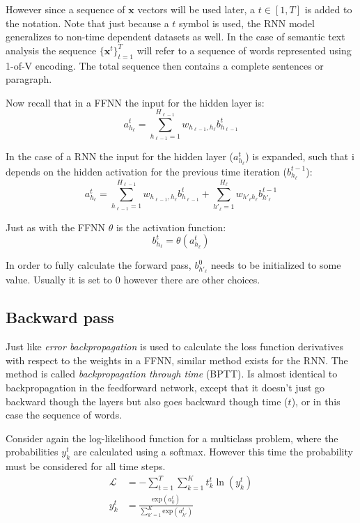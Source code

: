 However since a sequence of $\mathbf{x}$ vectors will be used later, a $t \in [1, T]$ is added to the notation. Note that just because a $t$ symbol is used, the RNN model generalizes to non-time dependent datasets as well. In the case of semantic text analysis the sequence $\{\mathbf{x}^t\}_{t=1}^T$ will refer to a sequence of words represented using 1-of-V encoding. The total sequence then contains a complete sentences or paragraph. 

Now recall that in a FFNN the input for the hidden layer is:
\begin{equation}
a_{h_\ell}^t = \sum_{h_{\ell-1}=1}^{H_{\ell-1}} w_{h_{\ell-1}, h_\ell} b_{h_{\ell-1}}^t
\end{equation}

In the case of a RNN the input for the hidden layer ($a_{h_\ell}^t$) is expanded, such that i depends on the hidden activation for the previous time iteration ($b_{h_\ell}^{t-1}$):
\begin{equation}
a_{h_\ell}^t = \sum_{h_{\ell-1}=1}^{H_{\ell-1}} w_{h_{\ell-1}, h_\ell} b_{h_{\ell-1}}^t + \sum_{h'_\ell=1}^{H_\ell} w_{h'_\ell h_\ell} b_{h'_\ell}^{t-1}
\end{equation}

Just as with the FFNN $\theta$ is the activation function:
\begin{equation}
b_{h_\ell}^t = \theta(a_{h_\ell}^t)
\end{equation}

In order to fully calculate the forward pass, $b_{h'_\ell}^0$ needs to be initialized to some value. Usually it is set to $0$ however there are other choices.

\subsection{Backward pass}

Just like \textit{error backpropagation} is used to calculate the loss function derivatives with respect to the weights in a FFNN, similar method exists for the RNN. The method is called \textit{backpropagation through time} (BPTT). Is almost identical to backpropagation in the feedforward network, except that it doesn't just go backward though the layers but also goes backward though time ($t$), or in this case the sequence of words. \cite{alexgraves}

Consider again the log-likelihood function for a multiclass problem, where the probabilities $y_k^t$ are calculated using a softmax. However this time the probability must be considered for all time steps.
\begin{align}
\mathcal{L} &= - \sum_{t=1}^T \sum_{k=1}^K t_k^t \ln(y_k^t) \\
y_k^t &= \frac{\mathrm{exp}(a_k^t)} {\sum_{k'=1}^K \mathrm{exp}(a_{k'}^t)}
\end{align}

